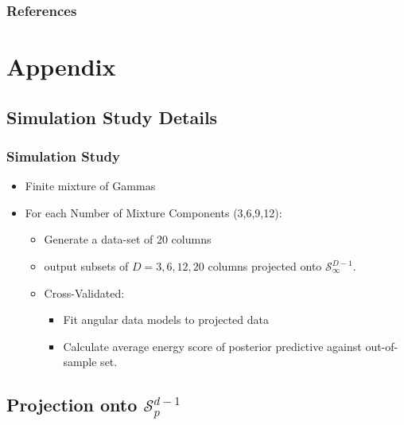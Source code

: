 \documentclass[aspectratio=169,10pt,notes]{beamer}
\begin{document}
\appendix

\begin{frame}[allowframebreaks]
    \frametitle{References}
    \footnotesize
    
\end{frame}

\section*{Appendix}

\subsection*{Simulation Study Details}

\begin{frame}
    \label{pgpareto:simstudydetails}
    \frametitle{Simulation Study}
    \begin{itemize}
        \item Finite mixture of Gammas
        \item For each Number of Mixture Components (3,6,9,12):
            \begin{itemize}
                \item Generate a data-set of 20 columns
                \item output subsets of $D = 3,6,12,20$ columns projected 
                    onto $\mathcal{S}_{\infty}^{D-1}$.
                \item Cross-Validated:
                    \begin{itemize}
                        \item Fit angular data models to projected data
                        \item Calculate average energy score of posterior 
                            predictive against out-of-sample set.
                    \end{itemize}
            \end{itemize}
    \end{itemize}
    \hyperlink{pgpareto:simstudy}{}
\end{frame} %

\subsection*{Projection onto $\mathcal{S}_p^{d-1}$}
\end{document}
